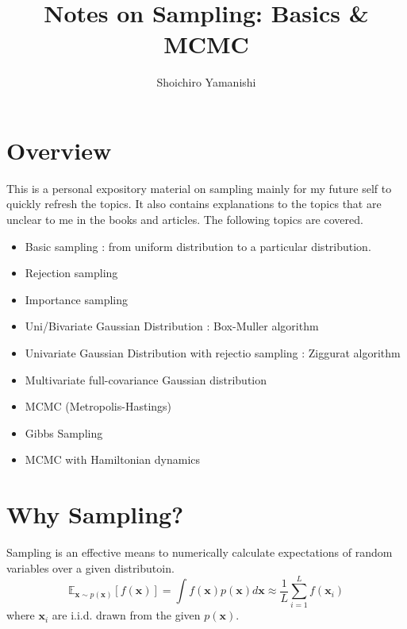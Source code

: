 \documentclass[a4]{article}
\title{ Notes on Sampling: Basics \& MCMC}
\author{Shoichiro Yamanishi}
\begin{document}
\maketitle



\section{Overview}
This is a personal expository material on sampling mainly 
for my future self to quickly refresh the topics.
It also contains explanations to the topics that are unclear to me in the books and articles.
The following topics are covered.

\begin{itemize}
\item Basic sampling : from uniform distribution to a particular distribution.
\item Rejection sampling
\item Importance sampling
\item Uni/Bivariate Gaussian Distribution : Box-Muller algorithm
\item Univariate Gaussian Distribution with rejectio sampling : Ziggurat algorithm
\item Multivariate full-covariance Gaussian distribution
\item MCMC (Metropolis-Hastings)
\item Gibbs Sampling
\item MCMC with Hamiltonian dynamics
\end{itemize}



\section{Why Sampling?}
Sampling is an effective means to numerically calculate expectations of random variables over 
a given distributoin.
\begin{equation}
\mathbb{E}_{\bm{x}\sim p(\bm{x})}\left[f(\bm{x})\right] = \int f(\bm{x})p(\bm{x})d\bm{x}
\approx \frac{1}{L}\sum_{i=1}^{L}f(\bm{x}_i)\label{eq:1}
\end{equation}
where $\bm{x}_i$ are i.i.d. drawn from the given $p(\bm{x})$.
\end{document}
